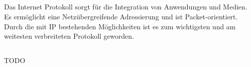 \subsection{}
\begin{answer}
Das Internet Protokoll sorgt für die Integration von Anwendungen und Medien. Es ermöglicht
eine Netzübergreifende Adressierung und ist Packet-orientiert.
Durch die mit IP bestehenden Möglichkeiten ist es zum wichtigsten und am weitesten verbreiteten
Protokoll geworden.
\end{answer}

\subsection{}
\begin{answer}
TODO
\end{answer}